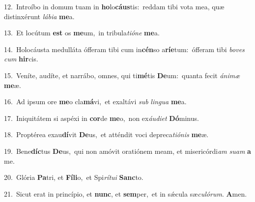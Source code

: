 {\numbfont\textcolor{\numbcolor}{12.}}~Introíbo in domum tuam in \textbf{ho}\-lo\-\textbf{cáus}\-tis:~\star reddam tibi vota mea, quæ distinxérunt \textit{lá}\-\textit{bi}\textit{a} \textbf{me}\-a.\par
{\numbfont\textcolor{\numbcolor}{13.}}~Et locútum \textbf{est} os \textbf{me}\-um,~\star in tribula\-\textit{ti}\-\textit{ó}\textit{ne} \textbf{me}\-a.\par
{\numbfont\textcolor{\numbcolor}{14.}}~Holocáusta medulláta ófferam tibi cum in\-\textbf{cén}\-so a\-\textbf{rí}\-\textbf{e}tum:~\star ófferam tibi \textit{bo}\-\textit{ves} \textit{cum} \textbf{hir}\-cis.\par
{\numbfont\textcolor{\numbcolor}{15.}}~Veníte, audíte, et narrábo, omnes, qui ti\-\textbf{mé}\-tis \textbf{De}\-um:~\star quanta fecit \textit{á}\-\textit{ni}\textit{mæ} \textbf{me}\-æ.\par
{\numbfont\textcolor{\numbcolor}{16.}}~Ad ipsum ore \textbf{me}\-o cla\-\textbf{má}\-vi,~\star et exaltávi \textit{sub} \textit{lin}\-\textit{gua} \textbf{me}\-a.\par
{\numbfont\textcolor{\numbcolor}{17.}}~Iniquitátem si aspéxi in \textbf{cor}\-de \textbf{me}\-o,~\star non ex\-\textit{áu}\-\textit{di}\textit{et} \textbf{Dó}\-minus.\par
{\numbfont\textcolor{\numbcolor}{18.}}~Proptérea exau\-\textbf{dí}\-vit \textbf{De}\-us,~\star et atténdit voci depreca\-\textit{ti}\-\textit{ó}\textit{nis} \textbf{me}\-æ.\par
{\numbfont\textcolor{\numbcolor}{19.}}~Bene\-\textbf{díc}\-tus \textbf{De}\-us,~\star qui non amóvit oratiónem meam, et misericórdi\textit{am} \textit{su}\-\textit{am} \textbf{a} me.\par
{\numbfont\textcolor{\numbcolor}{20.}}~Glória \textbf{Pa}\-tri, et \textbf{Fí}\-\textbf{li}o,~\star et Spi\-\textit{rí}\-\textit{tu}\textit{i} \textbf{Sanc}\-to.\par
{\numbfont\textcolor{\numbcolor}{21.}}~Sicut erat in princípio, et \textbf{nunc}\-, et \textbf{sem}\-per,~\star et in sǽcula sæ\-\textit{cu}\-\textit{ló}\textit{rum}. \textbf{A}\-men.\par
